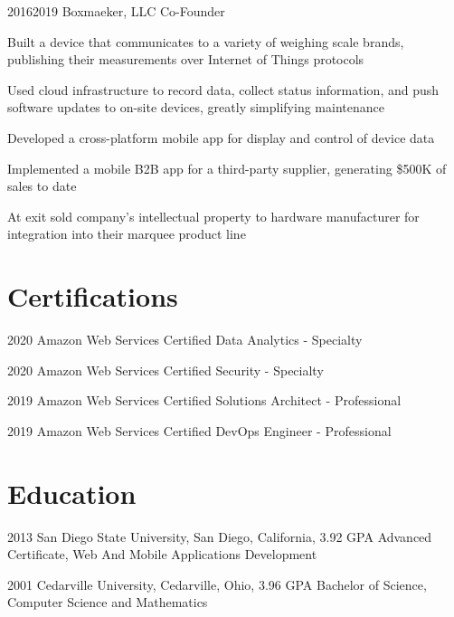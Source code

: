 \documentclass{article}
\begin{document}
\job
  {2016}{2019}
  {Boxmaeker, LLC}
  {Co-Founder}
  {\begin{achievements}
    \item Built a device that communicates to a variety of weighing scale brands, publishing their measurements over Internet of Things protocols
    \item Used cloud infrastructure to record data, collect status information, and push software updates to on-site devices, greatly simplifying maintenance
    \item Developed a cross-platform mobile app for display and control of device data
    \item Implemented a mobile B2B app for a third-party supplier, generating \$500K of sales to date
    \item At exit sold company's intellectual property to hardware manufacturer for integration into their marquee product line
  \end{achievements}}


\section{Certifications}

\education
  {2020}
  {Amazon Web Services}
  {Certified Data Analytics - Specialty}

\education
  {2020}
  {Amazon Web Services}
  {Certified Security - Specialty}

\education
  {2019}
  {Amazon Web Services}
  {Certified Solutions Architect - Professional}

\education
  {2019}
  {Amazon Web Services}
  {Certified DevOps Engineer - Professional}


\section{Education}

\education
  {2013}
  {San Diego State University, San Diego, California, 3.92 GPA}
  {Advanced Certificate, Web And Mobile Applications Development}

\education
  {2001}
  {Cedarville University, Cedarville, Ohio, 3.96 GPA}
  {Bachelor of Science, Computer Science and Mathematics}


\section{}

\credits
\end{document}
